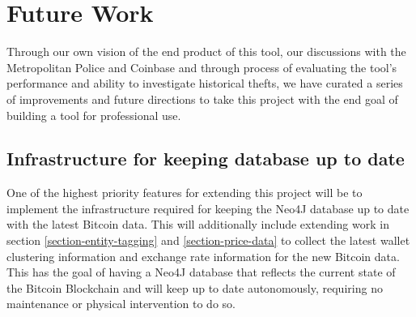 \section{Future Work}
Through our own vision of the end product of this tool, our discussions with the Metropolitan Police and Coinbase and through process of evaluating the tool's performance and ability to investigate historical thefts, we have curated a series of improvements and future directions to take this project with the end goal of building a tool for professional use. 

\subsection{Infrastructure for keeping database up to date}
One of the highest priority features for extending this project will be to implement the infrastructure required for keeping the Neo4J database up to date with the latest Bitcoin data. This will additionally include extending work in section \ref{section-entity-tagging} and \ref{section-price-data} to collect the latest wallet clustering information and exchange rate information for the new Bitcoin data. This has the goal of having a Neo4J database that reflects the current state of the Bitcoin Blockchain and will keep up to date autonomously, requiring no maintenance or physical intervention to do so. 

